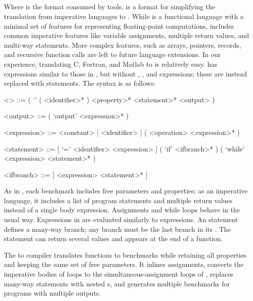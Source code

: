 \documentclass[main.tex]{subfiles}
\begin{document}
\subsection{\surface}

Where \core is the format consumed by tools,
  \surface is a format for simplifying the translation
  from imperative languages to \core.
While \core is a functional language
  with a minimal set of features
  for representing floating-point computations,
  \surface includes common imperative features
  like variable assignments,
  multiple return values,
  and multi-way  statements.
More complex features,
  such as arrays, pointers, records, and recursive function calls
  are left to future language extensions.
In our experience,
  translating C, Fortran, and Matlab to \surface is relatively easy.
\surface has expressions similar to those in \core,
  but without , , and  expressions;
  these are instead replaced with statements.
The \surface syntax is as follows:

\begin{grammar}
<\surface> ::= ( `\surface' ( <identifier>* ) <property>* <statement>* <output> )

<output> ::= ( `output' <expression>* )

<expression> ::= <constant> | <identifier> | ( <operation> <expression>* )

<statement> ::= [ `=' <identifier> <expression> ]
\alt ( `if' <ifbranch>* )
\alt ( `while' <expression> <statement>* )

<ifbranch> ::= [ <expression> <statement>* ]
\end{grammar}

As in \core, each \surface benchmark
  includes free parameters and properties;
  as an imperative language,
  it includes a list of program statements
  and multiple return values
  instead of a single body expression.
Assignments and while loops behave in the usual way.
Expressions in \surface are evaluated similarly to \core expressions.
An  statement defines a many-way branch;
  any  branch must be the last branch in its .
The  statement can return several values and appears
  at the end of a function.

The \surface to \core compiler
  translates \surface functions to \core benchmarks
  while retaining all properties and keeping the same set of free parameters.
It inlines assignments, converts the imperative bodies of \surface loops
  to the simultaneous-assignment loops of \core,
  replaces many-way  statements with nested s,
  and generates multiple \core benchmarks for \surface programs with
  multiple outputs.
\end{document}
